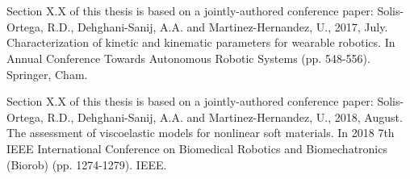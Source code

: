\section*{}

\vspace{10mm}

Section X.X of this thesis is based on a jointly-authored conference paper: Solis-Ortega, R.D., Dehghani-Sanij, A.A. and Martinez-Hernandez, U., 2017, July. Characterization of kinetic and kinematic parameters for wearable robotics. In Annual Conference Towards Autonomous Robotic Systems (pp. 548-556). Springer, Cham.

\vspace{10mm}

Section X.X of this thesis is based on a jointly-authored conference paper: Solis-Ortega, R.D., Dehghani-Sanij, A.A. and Martinez-Hernandez, U., 2018, August. The assessment of viscoelastic models for nonlinear soft materials. In 2018 7th IEEE International Conference on Biomedical Robotics and Biomechatronics (Biorob) (pp. 1274-1279). IEEE.

